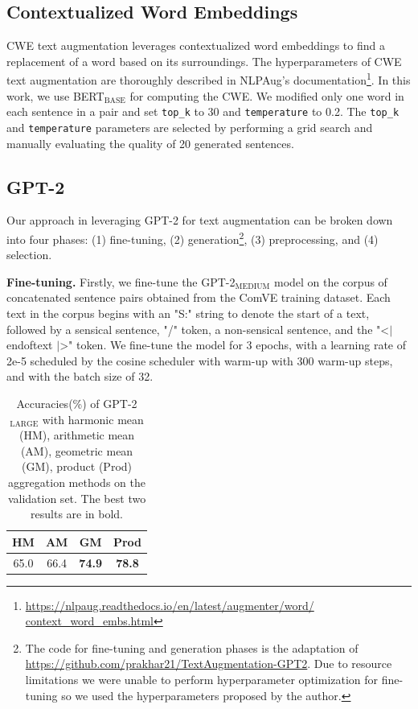 \documentclass[10pt, a4paper]{article}
\begin{document}
\subsection{Contextualized Word Embeddings}
\label{cwe}
CWE text augmentation leverages contextualized word embeddings to find a replacement of a word based on its surroundings. The hyperparameters of CWE text augmentation are thoroughly described in NLPAug's documentation\footnote{\href{https://nlpaug.readthedocs.io/en/latest/augmenter/\\word/context\_word\_embs.html}{https://nlpaug.readthedocs.io/en/latest/augmenter/word/\\context\_word\_embs.html}}. In this work, we use BERT$_{\text{BASE}}$ for computing the CWE. We modified only one word in each sentence in a pair and set \texttt{top\_k} to 30 and \texttt{temperature} to 0.2. The \texttt{top\_k} and \texttt{temperature} parameters are selected by performing a grid search and manually evaluating the quality of 20 generated sentences.

\subsection{GPT-2}
Our approach in leveraging GPT-2 for text augmentation can be broken down into four phases: (1) fine-tuning, (2) generation\footnote{The code for fine-tuning and generation phases is the adaptation of \href{https://github.com/prakhar21/TextAugmentation-GPT2}{https://github.com/prakhar21/TextAugmentation-GPT2}. Due to resource limitations we were unable to perform hyperparameter optimization for fine-tuning so we used the hyperparameters proposed by the author.}, (3) preprocessing, and (4) selection.

\textbf{Fine-tuning.} Firstly, we fine-tune the GPT-2$_\text{MEDIUM}$ model on the corpus of concatenated sentence pairs obtained from the ComVE training dataset. Each text in the corpus begins with an "S:" string to denote the start of a text, followed by a sensical sentence, "/" token, a non-sensical sentence, and the "\textless$\vert$ endoftext $\vert$\textgreater" token. We fine-tune the model for 3 epochs, with a learning rate of 2e-5 scheduled by the cosine scheduler with warm-up with 300 warm-up steps, and with the batch size of 32.

\begin{table}[t]
    \caption{Accuracies(\%) of GPT-2$_\text{LARGE}$ with harmonic mean (HM), arithmetic mean (AM), geometric mean (GM), product (Prod) aggregation methods on the validation set. The best two results are in bold.}
    \begin{center}
        

    \begin{tabular}{cccc}
    \toprule
         HM & AM & GM & Prod\\
         \midrule
           65.0 & 66.4 & \textbf{74.9} & \textbf{78.8}\\
          \bottomrule
    \end{tabular}

    \label{tab:LM}

    \end{center}
\end{table}
\end{document}
